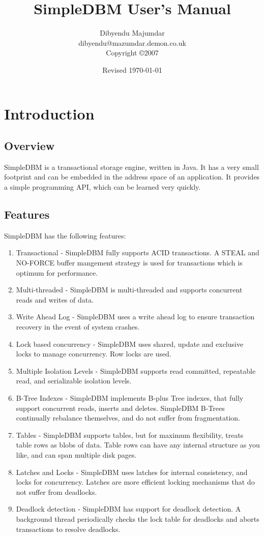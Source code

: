 \documentclass[a4paper,draft,oneside]{book}
\begin{document}
\title{SimpleDBM User's Manual}
\author{Dibyendu Majumdar\\
dibyendu@mazumdar.demon.co.uk\\
Copyright \copyright 2007}
\date{Revised \today}
\maketitle
\tableofcontents

\chapter{Introduction}

\section{Overview}
SimpleDBM is a transactional storage engine, written in Java. It has a
very small footprint and can be embedded in the address space of an
application. It provides a simple programming API, which can be
learned very quickly.

\section{Features}
SimpleDBM has the following features:
\begin{enumerate}
    \item Transactional - SimpleDBM fully supports ACID transactions. A STEAL and NO-FORCE buffer mangement strategy is used for transactions which is optimum for performance.
    \item Multi-threaded - SimpleDBM is multi-threaded and supports concurrent reads and writes of data.
    \item Write Ahead Log - SimpleDBM uses a write ahead log to ensure transaction recovery in the event of system crashes.
    \item Lock based concurrency - SimpleDBM uses shared, update and exclusive locks to manage concurrency. Row locks are used.
    \item Multiple Isolation Levels - SimpleDBM supports read committed, repeatable read, and serializable isolation levels.
    \item B-Tree Indexes - SimpleDBM implements B-plus Tree indexes, that fully support concurrent reads, inserts and deletes. SimpleDBM B-Trees continually rebalance themselves, and do not suffer from fragmentation.
    \item Tables - SimpleDBM supports tables, but for maximum flexibility, treats table rows as blobs of data. Table rows can have any internal structure as you like, and can span multiple disk pages.
    \item Latches and Locks - SimpleDBM uses latches for internal consistency, and locks for concurrency. Latches are more efficient locking mechanisms that do not suffer from deadlocks.
    \item Deadlock detection - SimpleDBM has support for deadlock detection. A background thread periodically checks the lock table for deadlocks and aborts transactions to resolve deadlocks.
\end{enumerate}
\end{document}
